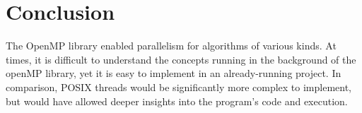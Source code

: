 \chapter{Conclusion}

The OpenMP library enabled parallelism for algorithms of various kinds.
At times, it is difficult to understand the concepts running in the background
of the openMP library, yet it is easy to implement in an already-running project.
In comparison, POSIX threads would be significantly more complex to implement, 
but would have allowed deeper insights into the program's code and execution.
